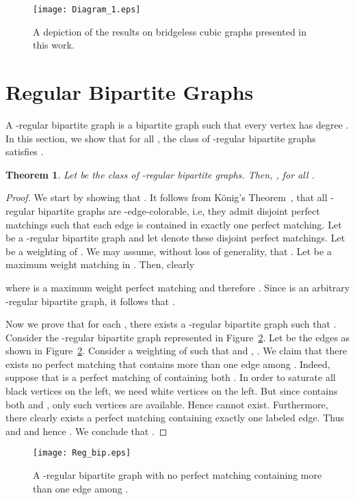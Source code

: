 \documentclass{article}
\newtheorem{thm}{Theorem}
\begin{document}
\begin{figure}[ht!]
\centering
\texttt{[image: Diagram\_1.eps]}
\caption{A depiction of the results on bridgeless cubic graphs presented in this work.}
\label{fig:diagram}
\end{figure}

\section{Regular Bipartite Graphs} \label{s:regular}

A -regular bipartite graph is a bipartite graph such that every vertex has degree . In this section, we show that for all , the class  of -regular bipartite graphs satisfies .

\begin{thm} \label{lem:lbip}
Let  be the class of -regular bipartite graphs. Then, , for all .
\end{thm}
\begin{proof}
We start by showing that . It follows from K\"{o}nig's Theorem~\cite{konig}, that all -regular bipartite graphs are -edge-colorable, i.e, they admit  disjoint perfect matchings such that each edge is contained in exactly one perfect matching. Let  be a -regular bipartite graph and let  denote these  disjoint perfect matchings. Let  be a weighting of . We may assume, without loss of generality, that . Let  be a maximum weight matching in . Then, clearly

where  is a maximum weight perfect matching and therefore . Since  is an arbitrary -regular bipartite graph, it follows that .

Now we prove that for each , there exists a -regular bipartite graph  such that . Consider the -regular bipartite graph  represented in Figure~\ref{fig:Reg_bip}. Let  be the edges as shown in Figure~\ref{fig:Reg_bip}.
Consider a weighting  of  such that  and , . We claim that there exists no perfect matching that contains more than one edge among . Indeed, suppose that  is a perfect matching of  containing both . In order to saturate all black vertices on the left, we need  white vertices on the left. But since  contains both  and , only  such vertices are available. Hence  cannot exist. Furthermore, there clearly exists a perfect matching containing exactly one labeled edge. Thus  and  and hence . We conclude that .
\end{proof}

\begin{figure}[ht]
\centering
\texttt{[image: Reg\_bip.eps]}
\caption{A -regular bipartite graph with no perfect matching containing more than one edge among .}
\label{fig:Reg_bip}
\end{figure}
\end{document}
